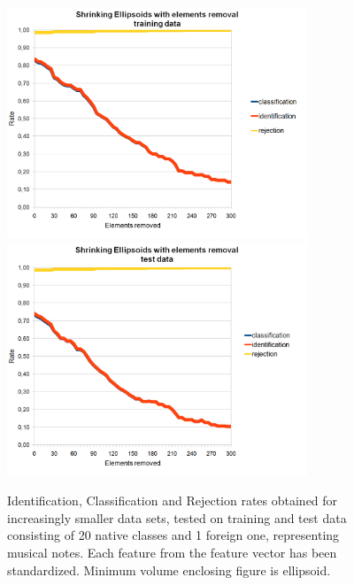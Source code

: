 \begin{figure}[htp]
	\centering
	\includegraphics[width=0.80\textwidth]{Figures/charts/MUSIC_NOTES_STANDARIZED/DIGITS_ShrinkingEllipsoidsElementsRemovalTraining.png}
	\hspace{12pt}
	\includegraphics[width=0.80\textwidth]{Figures/charts/MUSIC_NOTES_STANDARIZED/DIGITS_ShrinkingEllipsoidsElementsRemovalTest.png}
	\caption{ Identification, Classification and Rejection rates obtained for increasingly smaller data sets, tested on training and test data consisting of 20 native classes and 1 foreign one, representing musical notes. Each feature from the feature vector has been standardized. Minimum volume enclosing figure is ellipsoid. }
\end{figure}



